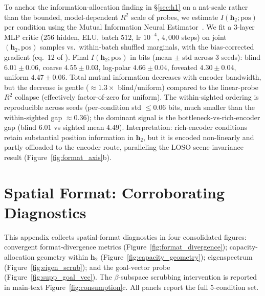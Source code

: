 \documentclass{article}
\begin{document}
To anchor the information-allocation finding in §\ref{sec:h1} on a nat-scale rather than the bounded, model-dependent $R^2$ scale of probes, we estimate $I(\mathbf{h}_2; \text{pos})$ per condition using the Mutual Information Neural Estimator~\citep{belghazi2018mine}. We fit a 3-layer MLP critic ($256$ hidden, ELU, batch $512$, lr $10^{-4}$, $4{,}000$ steps) on joint $(\mathbf{h}_2, \text{pos})$ samples vs.\ within-batch shuffled marginals, with the bias-corrected gradient (eq.~12 of \citealt{belghazi2018mine}). Final $I(\mathbf{h}_2; \text{pos})$ in bits (mean $\pm$ std across 3 seeds): blind $6.01 \pm 0.06$, coarse $4.55 \pm 0.03$, log-polar $4.66 \pm 0.04$, foveated $4.30 \pm 0.04$, uniform $4.47 \pm 0.06$. Total mutual information decreases with encoder bandwidth, but the decrease is gentle ($\approx 1.3\times$ blind/uniform) compared to the linear-probe $R^2$ collapse (effectively factor-of-zero for uniform). The within-sighted ordering is reproducible across seeds (per-condition std $\leq 0.06$ bits, much smaller than the within-sighted gap $\approx 0.36$); the dominant signal is the bottleneck-vs-rich-encoder gap (blind $6.01$ vs sighted mean $4.49$). Interpretation: rich-encoder conditions retain substantial position information in $\mathbf{h}_2$, but it is encoded non-linearly and partly offloaded to the encoder route, paralleling the LOSO scene-invariance result (Figure~\ref{fig:format_axis}b).


\section{Spatial Format: Corroborating Diagnostics}
\label{app:format-spatial-detail}

This appendix collects spatial-format diagnostics in four consolidated figures: convergent format-divergence metrics (Figure~\ref{fig:format_divergence}); capacity-allocation geometry within $\mathbf{h}_2$ (Figure~\ref{fig:capacity_geometry}); eigenspectrum (Figure~\ref{fig:eigen_scrub}); and the goal-vector probe (Figure~\ref{fig:supp_goal_vec}). The $\beta$-subspace scrubbing intervention is reported in main-text Figure~\ref{fig:consumption}c. All panels report the full 5-condition set.
\end{document}
